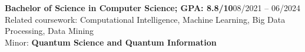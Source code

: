    {\textbf{Bachelor of Science in Computer Science;  GPA: 8.8/10}}{08/2021 -- 06/2024}
    \small{Related coursework: Computational Intelligence, Machine Learning, Big Data Processing, Data Mining}\\
    
    \small{Minor: \textbf{Quantum Science and Quantum Information}}\\
